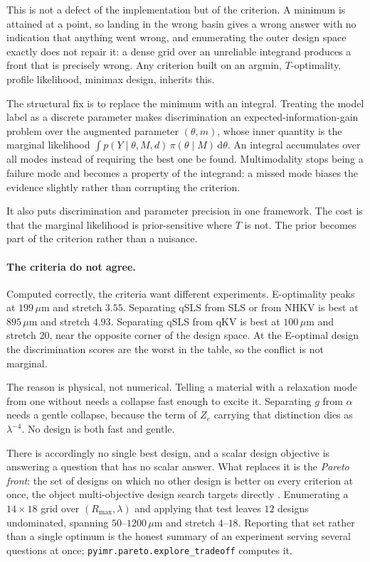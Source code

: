\documentclass[10pt]{article}
\begin{document}
This is not a defect of the implementation but of the criterion. A minimum is attained at a
point, so landing in the wrong basin gives a wrong answer with no indication that anything
went wrong, and enumerating the outer design space exactly does not repair it: a dense grid
over an unreliable integrand produces a front that is precisely wrong. Any criterion built
on an argmin, $T$-optimality, profile likelihood, minimax design, inherits this.

The structural fix is to replace the minimum with an integral. Treating the model label as a
discrete parameter makes discrimination an expected-information-gain problem over the
augmented parameter $(\theta, m)$, whose inner quantity is the marginal likelihood
$\int p(Y\mid\theta,M,d)\,\pi(\theta\mid M)\,\mathrm d\theta$. An integral accumulates over
all modes instead of requiring the best one be found. Multimodality stops being a failure mode
and becomes a property of the integrand: a missed mode biases the evidence slightly rather
than corrupting the criterion.

It also puts discrimination and parameter precision in one framework. The cost is that the
marginal likelihood is prior-sensitive where $T$ is not. The prior becomes part of the
criterion rather than a nuisance.

\paragraph{The criteria do not agree.}
Computed correctly, the criteria want different experiments. E-optimality peaks at $199\,\mu$m and stretch $3.55$. Separating qSLS from SLS or from NHKV is
best at $895\,\mu$m and stretch $4.93$. Separating qSLS from qKV is best at $100\,\mu$m and
stretch $20$, near the opposite corner of the design space. At the E-optimal design the
discrimination scores are the worst in the table, so the conflict is not marginal.

The reason is physical, not numerical. Telling a material with a relaxation mode from one
without needs a collapse fast enough to excite it. Separating $g$ from $\alpha$ needs a gentle
collapse, because the term of $Z_e$ carrying that distinction dies as $\lambda^{-4}$. No design
is both fast and gentle.

There is accordingly no single best design, and a scalar design objective is answering a
question that has no scalar answer. What replaces it is the \emph{Pareto front}: the set of
designs on which no other design is better on every criterion at once, the object multi-objective
design search targets directly \citep{knowles2006parego}. Enumerating a
$14\times18$ grid over $(R_{\max}, \lambda)$ and applying that test leaves $12$ designs
undominated, spanning $50$--$1200\,\mu$m and stretch $4$--$18$. Reporting that set rather than
a single optimum is the honest summary of an experiment serving several questions at once;
\texttt{pyimr.pareto.explore\_tradeoff} computes it.
\end{document}
